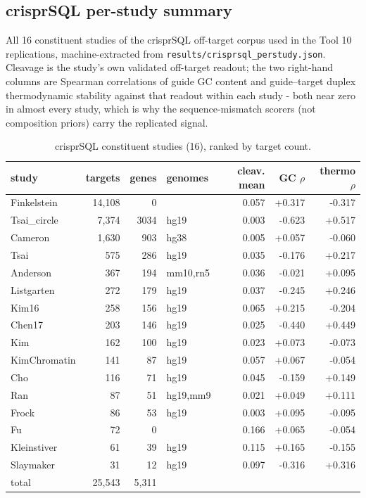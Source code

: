 \subsection{crisprSQL per-study summary}
\label{app:crisprsql-perstudy}
All 16 constituent studies of the crisprSQL off-target corpus used in the
Tool 10 replications, machine-extracted from
\texttt{results/crisprsql\_perstudy.json}. Cleavage is the study's own
validated off-target readout; the two right-hand columns are Spearman
correlations of guide GC content and guide--target duplex thermodynamic
stability against that readout within each study - both near zero in
almost every study, which is why the sequence-mismatch scorers (not
composition priors) carry the replicated signal.
\begin{table}[h]
\centering\footnotesize
\caption{crisprSQL constituent studies (16), ranked by target count.}
\label{tab:crisprsql-perstudy}
\begin{tabular}{lrrlrrr}
\hline
study & targets & genes & genomes & cleav. mean & GC $\rho$ & thermo $\rho$ \\
\hline
Finkelstein & 14{,}108 & 0 &  & 0.057 & +0.317 & -0.317 \\
Tsai\_circle & 7{,}374 & 3034 & hg19 & 0.003 & -0.623 & +0.517 \\
Cameron & 1{,}630 & 903 & hg38 & 0.005 & +0.057 & -0.060 \\
Tsai & 575 & 286 & hg19 & 0.035 & -0.176 & +0.217 \\
Anderson & 367 & 194 & mm10{,}rn5 & 0.036 & -0.021 & +0.095 \\
Listgarten & 272 & 179 & hg19 & 0.037 & -0.245 & +0.246 \\
Kim16 & 258 & 156 & hg19 & 0.065 & +0.215 & -0.204 \\
Chen17 & 203 & 146 & hg19 & 0.025 & -0.440 & +0.449 \\
Kim & 162 & 100 & hg19 & 0.023 & +0.073 & -0.073 \\
KimChromatin & 141 & 87 & hg19 & 0.057 & +0.067 & -0.054 \\
Cho & 116 & 71 & hg19 & 0.045 & -0.159 & +0.149 \\
Ran & 87 & 51 & hg19{,}mm9 & 0.021 & +0.049 & +0.111 \\
Frock & 86 & 53 & hg19 & 0.003 & +0.095 & -0.095 \\
Fu & 72 & 0 &  & 0.166 & +0.065 & -0.054 \\
Kleinstiver & 61 & 39 & hg19 & 0.115 & +0.165 & -0.155 \\
Slaymaker & 31 & 12 & hg19 & 0.097 & -0.316 & +0.316 \\
\hline
total & 25{,}543 & 5{,}311 &  &  &  &  \\
\hline
\end{tabular}
\end{table}
